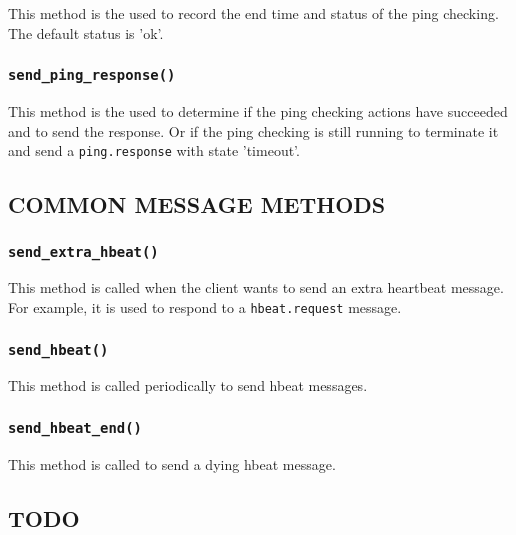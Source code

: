 This method is the used to record the end time and status of the ping
checking.  The default status is 'ok'.

\subsubsection*{\texttt{send\_ping\_response()}\label{xPL::Client_send_ping_response_}}


This method is the used to determine if the ping checking actions have
succeeded and to send the response.  Or if the ping checking is still
running to terminate it and send a \texttt{ping.response} with state
'timeout'.

\subsection*{COMMON MESSAGE METHODS\label{xPL::Client_COMMON_MESSAGE_METHODS}}
\subsubsection*{\texttt{send\_extra\_hbeat()}\label{xPL::Client_send_extra_hbeat_}}


This method is called when the client wants to send an extra heartbeat
message.  For example, it is used to respond to a \texttt{hbeat.request}
message.

\subsubsection*{\texttt{send\_hbeat()}\label{xPL::Client_send_hbeat_}}


This method is called periodically to send hbeat messages.

\subsubsection*{\texttt{send\_hbeat\_end()}\label{xPL::Client_send_hbeat_end_}}


This method is called to send a dying hbeat message.

\subsection*{TODO\label{xPL::Client_TODO}}


